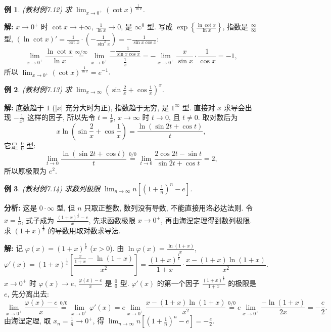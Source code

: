 \documentclass[UTF8,openany]{ctexbook}
\theoremstyle{chinesetextbook}
\newtheorem{example}{例}[section]
\newenvironment{cnsolution}{\par\indent\textbf{解:} \ignorespaces}{\par}
\begin{document}
\begin{example}\label{ex:c2-7-12}
\textnormal{(教材例7.12)} 求 $\displaystyle\lim_{x\to0^+}(\cot x)^{\frac1{\ln x}}$.
\end{example}
\begin{cnsolution}
$x\to0^+$ 时 $\cot x\to+\infty$, $\displaystyle\frac1{\ln x}\to0$, 是 $\infty^0$ 型. 写成 $\displaystyle\exp\left\{\frac{\ln\cot x}{\ln x}\right\}$, 指数是 $\displaystyle\frac\infty\infty$ 型, $\displaystyle(\ln\cot x)'=\frac1{\cot x}\cdot\left(-\frac1{\sin^2x}\right)=-\frac1{\sin x\cos x}$:
\[
\lim_{x\to0^+}\frac{\ln\cot x}{\ln x}\overset{\infty/\infty}{=}\lim_{x\to0^+}\frac{-\frac1{\sin x\cos x}}{\frac1x}=-\lim_{x\to0^+}\frac x{\sin x}\cdot\frac1{\cos x}=-1,
\]
所以 $\displaystyle\lim_{x\to0^+}(\cot x)^{\frac1{\ln x}}=e^{-1}$.
\end{cnsolution}
\begin{example}\label{ex:c2-7-13}
\textnormal{(教材例7.13)} 求 $\displaystyle\lim_{x\to\infty}\left(\sin\frac2x+\cos\frac1x\right)^x$.
\end{example}
\begin{cnsolution}
底数趋于 $1$ ($|x|$ 充分大时为正), 指数趋于无穷, 是 $1^\infty$ 型. 直接对 $x$ 求导会出现 $\displaystyle-\frac1{x^2}$ 这样的因子, 所以先令 $\displaystyle t=\frac1x$, $x\to\infty$ 时 $t\to0$, 且 $t\ne0$. 取对数后为
\[
x\ln\left(\sin\frac2x+\cos\frac1x\right)=\frac{\ln(\sin2t+\cos t)}t,
\]
它是 $\displaystyle\frac00$ 型:
\[
\lim_{t\to0}\frac{\ln(\sin2t+\cos t)}t\overset{0/0}{=}\lim_{t\to0}\frac{2\cos2t-\sin t}{\sin2t+\cos t}=2,
\]
所以原极限为 $e^2$.
\end{cnsolution}
\begin{example}\label{ex:c2-7-14}
\textnormal{(教材例7.14)} 求数列极限 $\displaystyle\lim_{n\to\infty}n\left[\left(1+\frac1n\right)^n-e\right]$.
\end{example}
\par\indent\textbf{分析:} 这是 $0\cdot\infty$ 型, 但 $n$ 只取正整数, 数列没有导数, 不能直接用洛必达法则. 令 $\displaystyle x=\frac1n$, 式子成为 $\displaystyle\frac{(1+x)^{\frac1x}-e}x$, 先求函数极限 $x\to0^+$, 再由海涅定理得到数列极限. 求 $(1+x)^{\frac1x}$ 的导数用取对数求导法.
\begin{cnsolution}
记 $\varphi(x)=(1+x)^{\frac1x}$ ($x>0$). 由 $\displaystyle\ln\varphi(x)=\frac{\ln(1+x)}x$,
\[
\varphi'(x)=(1+x)^{\frac1x}\left[\frac{\frac x{1+x}-\ln(1+x)}{x^2}\right]=\frac{(1+x)^{\frac1x}}{1+x}\cdot\frac{x-(1+x)\ln(1+x)}{x^2}.
\]
$x\to0^+$ 时 $\varphi(x)\to e$, $\displaystyle\frac{\varphi(x)-e}x$ 是 $\displaystyle\frac00$ 型. $\varphi'(x)$ 的第一个因子 $\displaystyle\frac{(1+x)^{\frac1x}}{1+x}$ 的极限是 $e$, 先分离出去:
\[
\lim_{x\to0^+}\frac{\varphi(x)-e}x\overset{0/0}{=}\lim_{x\to0^+}\varphi'(x)=e\lim_{x\to0^+}\frac{x-(1+x)\ln(1+x)}{x^2}\overset{0/0}{=}e\lim_{x\to0^+}\frac{-\ln(1+x)}{2x}=-\frac e2.
\]
由海涅定理, 取 $\displaystyle x_n=\frac1n\to0^+$, 得 $\displaystyle\lim_{n\to\infty}n\left[\left(1+\frac1n\right)^n-e\right]=-\frac e2$.
\end{cnsolution}
\end{document}
